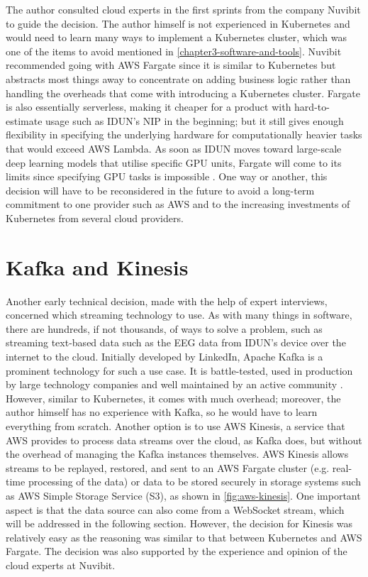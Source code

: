 The author consulted cloud experts in the first sprints from the company Nuvibit to guide the decision. The author himself is not experienced in Kubernetes and would need to learn many ways to implement a Kubernetes cluster, which was one of the items to avoid mentioned in \autoref{chapter3-software-and-tools}. Nuvibit recommended going with AWS Fargate since it is similar to Kubernetes but abstracts most things away to concentrate on adding business logic rather than handling the overheads that come with introducing a Kubernetes cluster. Fargate is also essentially serverless, making it cheaper for a product with hard-to-estimate usage such as IDUN’s NIP in the beginning; but it still gives enough flexibility in specifying the underlying hardware for computationally heavier tasks that would exceed AWS Lambda. As soon as IDUN moves toward large-scale deep learning models that utilise specific GPU units, Fargate will come to its limits since specifying GPU tasks is impossible \citep{amazon_web_services_inc_aws_2019}. One way or another, this decision will have to be reconsidered in the future to avoid a long-term commitment to one provider such as AWS and to the increasing investments of Kubernetes from several cloud providers.

\section*{Kafka and Kinesis}
\label{chapter4-kafka-aws-kinesis}

Another early technical decision, made with the help of expert interviews, concerned which streaming technology to use. As with many things in software, there are hundreds, if not thousands, of ways to solve a problem, such as streaming text-based data such as the EEG data from IDUN’s device over the internet to the cloud. Initially developed by LinkedIn, Apache Kafka is a prominent technology for such a use case. It is battle-tested, used in production by large technology companies \citep{apache_apache_nodate} and well maintained by an active community \citep{apache_apache_2022}. However, similar to Kubernetes, it comes with much overhead; moreover, the author himself has no experience with Kafka, so he would have to learn everything from scratch. Another option is to use AWS Kinesis, a service that AWS provides to process data streams over the cloud, as Kafka does, but without the overhead of managing the Kafka instances themselves. AWS Kinesis allows streams to be replayed, restored, and sent to an AWS Fargate cluster (e.g. real-time processing of the data) or data to be stored securely in storage systems such as AWS Simple Storage Service (S3), as shown in \autoref{fig:aws-kinesis}. One important aspect is that the data source can also come from a WebSocket stream, which will be addressed in the following section. However, the decision for Kinesis was relatively easy as the reasoning was similar to that between Kubernetes and AWS Fargate. The decision was also supported by the experience and opinion of the cloud experts at Nuvibit.

